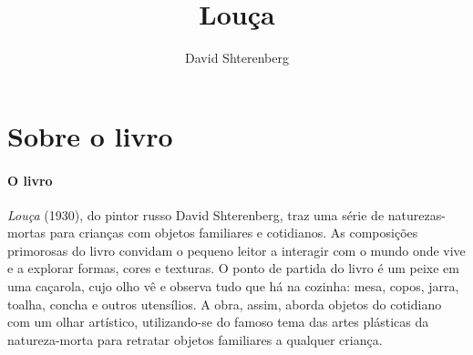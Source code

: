 \documentclass[11pt]{extarticle}
\newcommand{\AutorLivro}{David Shterenberg}
\newcommand{\TituloLivro}{Louça}
\newcommand{\colaborador}{{Paulo Pompermaier e Renier Silva}}
\begin{document}
\title{\TituloLivro}
\author{\AutorLivro}
\def\authornotes{\colaborador}

\date{}
\maketitle


\tableofcontents



\section{Sobre o livro}

\paragraph{O livro} \textit{Louça} (1930), do pintor russo David Shterenberg, traz uma série de naturezas-mortas para crianças com objetos familiares e cotidianos. As composições primorosas do livro convidam o pequeno leitor a interagir com o mundo onde vive e a explorar formas, cores e texturas. O ponto de partida do livro é um peixe em uma caçarola, cujo olho vê e observa tudo que há na cozinha: mesa, copos, jarra, toalha, concha e outros utensílios. A obra, assim, aborda objetos do cotidiano com um olhar artístico, utilizando-se do famoso tema das artes plásticas da natureza-morta para retratar objetos familiares a qualquer criança.

\end{document}
